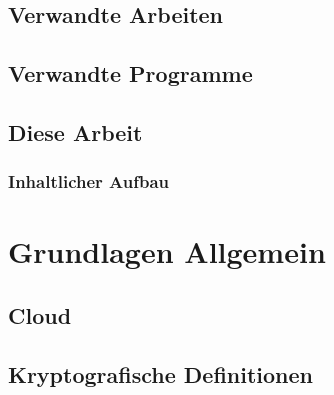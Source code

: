 \documentclass[10pt, a4paper]{scrreprt}
\begin{document}
\section{Verwandte Arbeiten}
\section{Verwandte Programme}


\section{Diese Arbeit}
\subsection{Inhaltlicher Aufbau}



\chapter{Grundlagen Allgemein}
\section{Cloud}
\section{Kryptografische Definitionen}
\end{document}
